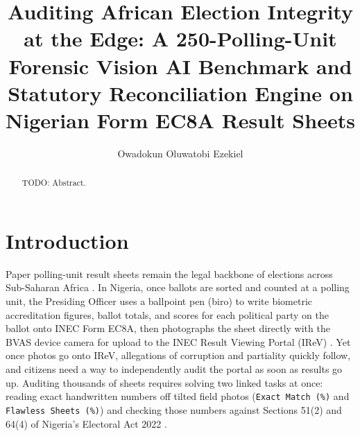 \documentclass{article}
\title{Auditing African Election Integrity at the Edge: A 250-Polling-Unit Forensic Vision AI Benchmark and Statutory Reconciliation Engine on Nigerian Form EC8A Result Sheets}
\author{Owadokun Oluwatobi Ezekiel}
\date{}
\begin{document}
\maketitle

\begin{abstract}
TODO: Abstract.
\end{abstract}

\section{Introduction}

Paper polling-unit result sheets remain the legal backbone of elections across Sub-Saharan Africa \cite{inec2022electoral,kimani2022using,veza2024inec}. In Nigeria, once ballots are sorted and counted at a polling unit, the Presiding Officer uses a ballpoint pen (biro) to write biometric accreditation figures, ballot totals, and scores for each political party on the ballot onto INEC Form EC8A, then photographs the sheet directly with the BVAS device camera for upload to the INEC Result Viewing Portal (IReV) \cite{inec2022electoral,veza2024inec,uwakwe2026ai}. Yet once photos go onto IReV, allegations of corruption and partiality quickly follow, and citizens need a way to independently audit the portal as soon as results go up. Auditing thousands of sheets requires solving two linked tasks at once: reading exact handwritten numbers off tilted field photos (\texttt{Exact Match (\%)} and \texttt{Flawless Sheets (\%)}) and checking those numbers against Sections 51(2) and 64(4) of Nigeria's Electoral Act 2022 \cite{inec2022electoral,young2026irevsentinel}.
\end{document}
